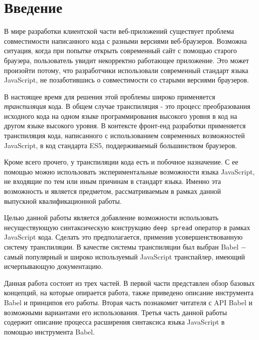 \documentclass[14pt, a4paper]{article}
\def\code#1{\texttt{#1}} %
\begin{document}

\tableofcontents
\pagebreak

\section*{Введение}

В мире разработки клиентской части веб-приложений существует проблема совместимости написанного кода 
с разными версиями веб-браузеров. Возможна ситуация, когда при попытке открыть современный сайт с 
помощью старого браузера, пользователь увидит некорректно работающее приложение. Это может произойти 
потому, что разработчики использовали современный стандарт языка JavaScript, не позаботившись о 
совместимости со старыми версиями браузеров. 

В настоящее время для решения этой проблемы широко применяется \textit{транспиляция} кода. В общем случае 
транспиляция - это процесс преобразования исходного кода на одном языке программирования высокого 
уровня в код на другом языке высокого уровня. В контексте фронт-енд разработки применяется 
транспиляция кода, написанного с использованием современных возможностей JavaScript, в код стандарта 
ES5, поддерживаемый большинством браузеров.

Кроме всего прочего, у транспиляции кода есть и побочное назначение. С ее помощью можно использовать 
экспериментальные возможности языка JavaScript, не входящие по тем или иным причинам в стандарт языка. 
Именно эта возможность и является предметом, рассматриваемым в рамках данной выпускной квалификационной работы.

Целью данной работы является добавление возможности использовать несуществующую синтаксическую 
конструкцию \code{deep spread} оператор в рамках JavaScript кода. Сделать это предполагается, 
применив усовершенствованную систему транспиляции. В качестве системы транспиляции был выбран Babel 
$-$  самый популярный и широко используемый JavaScript транспайлер, имеющий исчерпывающую документацию.

Данная работа состоит из трех частей. В первой части представлен обзор базовых концепций, 
на которые опирается работа, также приведено описание инструмента Babel и принципов его работы. 
Вторая часть познакомит читателя с API Babel и возможными вариантами его использования. Третья часть 
данной работы содержит описание процесса расширения синтаксиса языка JavaScript в помощью инструмента Babel.
\end{document}
